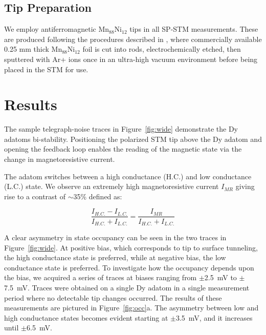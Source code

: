 \documentclass[
reprint,amsmath,amssymb,aps]{revtex4-2}
\begin{document}
\subsection{Tip Preparation}
We employ antiferromagnetic Mn$_{88}$Ni$_{12}$ tips in all SP-STM measurements. These are produced following the procedures described in \citep{Forrester2018}, where commercially available 0.25 mm thick Mn$_{88}$Ni$_{12}$ foil is cut into rods, electrochemically etched, then sputtered with Ar+ ions once in an ultra-high vacuum environment before being placed in the STM for use.



\section{Results}
The sample telegraph-noise traces in Figure~\ref{fig:wide} demonstrate the Dy adatoms bi-stability.
Positioning the polarized STM tip above the Dy adatom and opening the feedback loop enables the reading of the magnetic state via the change in magnetoresistive current.
 
The adatom switches between a high conductance (H.C.) and low conductance (L.C.) state. We observe an extremely high magnetoresistive current $I_{MR}$ giving rise to a contrast of $\sim$35\% defined as: 

\begin{equation}
\frac{I_{H.C.}-I_{L.C.}}{I_{H.C.}+I_{L.C.}}=\frac{I_{MR}}{I_{H.C.}+I_{L.C.}}
\end{equation}

A clear asymmetry in state occupancy can be seen in the two traces in Figure~\ref{fig:wide}. At positive bias, which corresponds to tip to surface tunneling, the high conductance state is preferred, while at negative bias, the low conductance state is preferred. To investigate how the occupancy depends upon the bias, we acquired a series of traces at biases ranging from $\pm$2.5~mV to $\pm$7.5~mV. Traces were obtained on a single Dy adatom in a single measurement period where no detectable tip changes occurred.
The results of these measurements are pictured in Figure~\ref{fig:occ}a. The asymmetry between low and high conductance states becomes evident starting at $\pm$3.5~mV, and it increases until $\pm$6.5~mV.
\end{document}
